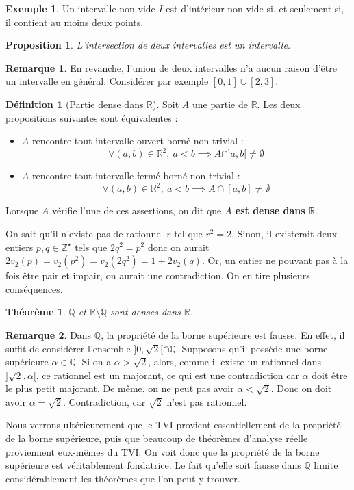 \documentclass[french]{book}
\newcommand{\Z}{\mathbb{Z}}
\newcommand{\Q}{\mathbb{Q}}
\newcommand{\R}{\mathbb{R}}
\newcommand{\st}{^\star}
\theoremstyle{plain}
\newtheorem{thm}{Théorème}[chapter]
\newtheorem{prop}{Proposition}[chapter]
\theoremstyle{definition}
\newtheorem{dfn}{Définition}[chapter]
\newtheorem{exa}{Exemple}[chapter]
\newtheorem{rmq}{Remarque}[chapter]
\theoremstyle{remark}
\begin{document}
\begin{exa}
	Un intervalle non vide $I$ est d'intérieur non vide si, et seulement si, il contient au moins deux points.
\end{exa}
\begin{prop}
	L'intersection de deux intervalles est un intervalle.
\end{prop}
\begin{rmq}
	En revanche, l'union de deux intervalles n'a aucun raison d'être un intervalle en général. Considérer par exemple $\left[0,1\right]\cup\left[2,3\right]$.
\end{rmq}
\begin{dfn}[Partie dense dans $\R$]
	Soit $A$ une partie de $\R$. Les deux propositions suivantes sont équivalentes :
	\begin{itemize}
		\item $A$ rencontre tout intervalle ouvert borné non trivial :$$\forall(a,b)\in\R^2,\ a<b\implies A\cap]a,b[\ne\emptyset$$
		\item $A$ rencontre tout intervalle fermé borné non trivial :$$\forall(a,b)\in\R^2,\ a<b\implies A\cap[a,b]\ne\emptyset$$
	\end{itemize}
	Lorsque $A$ vérifie l'une de ces assertions, on dit que \textbf{$A$ est dense dans $\R$}.
\end{dfn}
On sait qu'il n'existe pas de rationnel $r$ tel que $r^2=2$. Sinon, il existerait deux entiers $p,q\in\Z\st$ tels que $2q^2=p^2$ donc on aurait $2v_2(p)=v_2(p^2)=v_2(2q^2)=1+2v_2(q)$. Or, un entier ne pouvant pas à la fois être pair et impair, on aurait une contradiction. On en tire plusieurs conséquences.
\begin{thm}
	$\Q$ et $\R\setminus\Q$ sont denses dans $\R$.
\end{thm}
\begin{rmq}
	Dans $\Q$, la propriété de la borne supérieure est fausse. En effet, il suffit de considérer l'ensemble $]0,\sqrt{2}[\cap\Q$. Supposons qu'il possède une borne supérieure $\alpha\in\Q$. Si on a $\alpha>\sqrt{2}$, alors, comme il existe un rationnel dans $]\sqrt{2},\alpha[$, ce rationnel est un majorant, ce qui est une contradiction car $\alpha$ doit être le plus petit majorant. De même, on ne peut pas avoir $\alpha<\sqrt{2}$. Donc on doit avoir $\alpha=\sqrt{2}$. Contradiction, car $\sqrt{2}$ n'est pas rationnel.
\end{rmq}
Nous verrons ultérieurement que le TVI provient essentiellement de la propriété de la borne supérieure, puis que beaucoup de théorèmes d'analyse réelle proviennent eux-mêmes du TVI. On voit donc que la propriété de la borne supérieure est véritablement fondatrice. Le fait qu'elle soit fausse dans $\Q$ limite considérablement les théorèmes que l'on peut y trouver.
\end{document}
